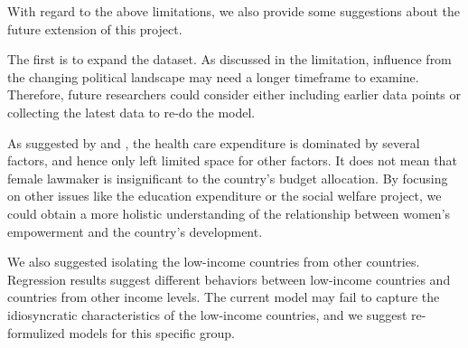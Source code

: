 With regard to the above limitations, we also provide some suggestions about the future extension of this project.

The first is to expand the dataset.
As discussed in the limitation, influence from the changing political landscape may need a longer timeframe to examine.
Therefore, future researchers could consider either including earlier data points or collecting the latest data to re-do the model. 

As suggested by  and , the health care expenditure is dominated by several factors, and hence only left limited space for other factors.
It does not mean that female lawmaker is insignificant to the country's budget allocation.
By focusing on other issues like the education expenditure or the social welfare project, we could obtain a more holistic understanding of the relationship between women's empowerment and the country's development. 



We also suggested isolating the low-income countries from other countries.
Regression results suggest different behaviors between low-income countries and countries from other income levels.
The current model may fail to capture the idiosyncratic characteristics of the low-income countries, and we suggest re-formulized models for this specific group. 




